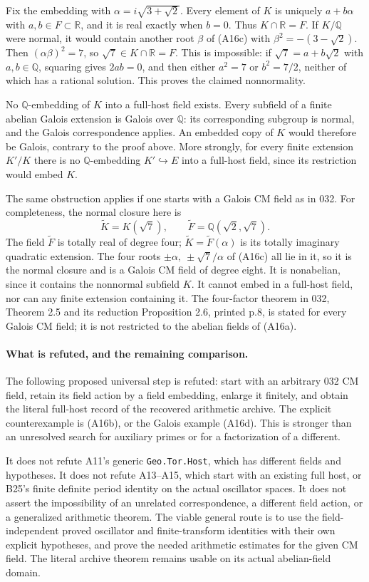 \documentclass[11pt]{article}
\newcommand{\Q}{\mathbb Q}\newcommand{\C}{\mathbb C}\newcommand{\Z}{\mathbb Z}\newcommand{\R}{\mathbb R}\newcommand{\A}{\mathbb A}\newcommand{\OO}{\mathcal O}
\theoremstyle{definition}\newtheorem{definition}[theorem]{Definition}\newtheorem{remark}[theorem]{Remark}
\begin{document}
Fix the embedding with $\alpha=i\sqrt{3+\sqrt2}$.
Every element of $K$ is uniquely $a+b\alpha$ with
$a,b\in F\subset\R$, and it is real exactly when
$b=0$. Thus $K\cap\R=F$. If $K/\Q$ were normal,
it would contain another root $\beta$ of (A16c) with
$\beta^2=-(3-\sqrt2)$. Then
$(\alpha\beta)^2=7$, so $\sqrt7\in K\cap\R=F$.
This is impossible: if $\sqrt7=a+b\sqrt2$ with
$a,b\in\Q$, squaring gives $2ab=0$, and then either
$a^2=7$ or $b^2=7/2$, neither of which has a rational
solution. This proves the claimed nonnormality.

No $\Q$-embedding of $K$ into a full-host field exists.
Every subfield of a finite abelian Galois extension is
Galois over $\Q$: its corresponding subgroup is normal,
and the Galois correspondence applies. An embedded copy
of $K$ would therefore be Galois, contrary to the proof
above. More strongly, for every finite extension
$K'/K$ there is no $\Q$-embedding $K'\hookrightarrow E$
into a full-host field, since its restriction would
embed $K$.

The same obstruction applies if one starts with a
Galois CM field as in 032. For completeness, the normal
closure here is
\[
       \widetilde K=K(\sqrt7),\qquad
       \widetilde F=\Q(\sqrt2,\sqrt7).
 \tag{A16d}
\]
The field $\widetilde F$ is totally real of degree four;
$\widetilde K=\widetilde F(\alpha)$ is its totally
imaginary quadratic extension. The four roots
$\pm\alpha,\ \pm\sqrt7/\alpha$ of (A16c) all lie
in it, so it is the normal closure and is a Galois
CM field of degree eight. It is nonabelian, since it
contains the nonnormal subfield $K$. It cannot embed
in a full-host field, nor can any finite extension
containing it. The four-factor theorem in 032,
Theorem 2.5 and its reduction Proposition 2.6, printed p.8,
is stated for every Galois CM field; it is not
restricted to the abelian fields of (A16a).

\paragraph{What is refuted, and the remaining comparison.}
The following proposed universal step is refuted:
start with an arbitrary 032 CM field, retain its field
action by a field embedding, enlarge it finitely, and
obtain the literal full-host record of the recovered
arithmetic archive. The explicit counterexample is
(A16b), or the Galois example (A16d). This is stronger
than an unresolved search for auxiliary primes or
for a factorization of a different.

It does not refute A11's generic
\texttt{Geo.Tor.Host}, which has different fields and
hypotheses. It does not refute A13--A15, which start
with an existing full host, or B25's finite definite
period identity on the actual oscillator spaces.
It does not assert the impossibility of an unrelated
correspondence, a different field action, or a
generalized arithmetic theorem. The viable general
route is to use the field-independent proved
oscillator and finite-transform identities with
their own explicit hypotheses, and prove the needed
arithmetic estimates for the given CM field. The
literal archive theorem remains usable on its actual
abelian-field domain.
\end{document}
